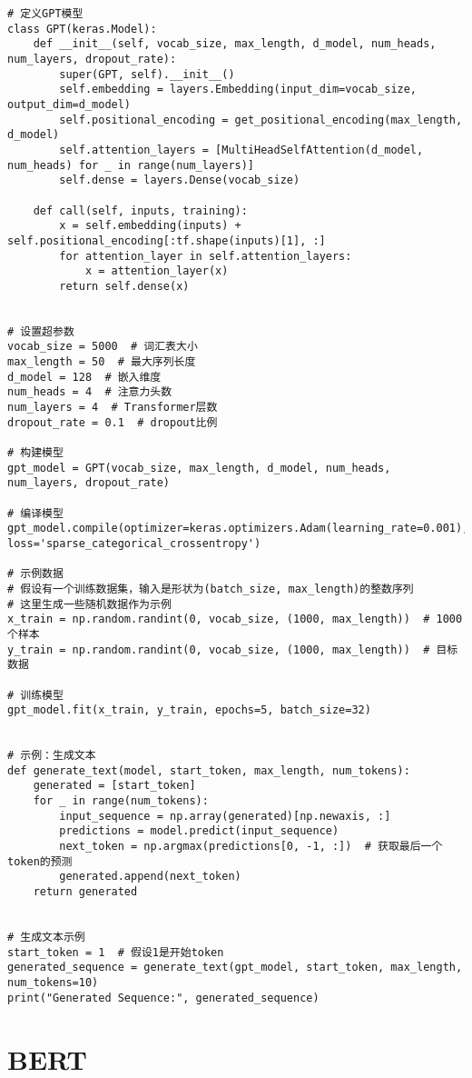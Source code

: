 \begin{lstlisting}
# 定义GPT模型
class GPT(keras.Model):
    def __init__(self, vocab_size, max_length, d_model, num_heads, num_layers, dropout_rate):
        super(GPT, self).__init__()
        self.embedding = layers.Embedding(input_dim=vocab_size, output_dim=d_model)
        self.positional_encoding = get_positional_encoding(max_length, d_model)
        self.attention_layers = [MultiHeadSelfAttention(d_model, num_heads) for _ in range(num_layers)]
        self.dense = layers.Dense(vocab_size)

    def call(self, inputs, training):
        x = self.embedding(inputs) + self.positional_encoding[:tf.shape(inputs)[1], :]
        for attention_layer in self.attention_layers:
            x = attention_layer(x)
        return self.dense(x)


# 设置超参数
vocab_size = 5000  # 词汇表大小
max_length = 50  # 最大序列长度
d_model = 128  # 嵌入维度
num_heads = 4  # 注意力头数
num_layers = 4  # Transformer层数
dropout_rate = 0.1  # dropout比例

# 构建模型
gpt_model = GPT(vocab_size, max_length, d_model, num_heads, num_layers, dropout_rate)

# 编译模型
gpt_model.compile(optimizer=keras.optimizers.Adam(learning_rate=0.001), loss='sparse_categorical_crossentropy')

# 示例数据
# 假设有一个训练数据集，输入是形状为(batch_size, max_length)的整数序列
# 这里生成一些随机数据作为示例
x_train = np.random.randint(0, vocab_size, (1000, max_length))  # 1000个样本
y_train = np.random.randint(0, vocab_size, (1000, max_length))  # 目标数据

# 训练模型
gpt_model.fit(x_train, y_train, epochs=5, batch_size=32)


# 示例：生成文本
def generate_text(model, start_token, max_length, num_tokens):
    generated = [start_token]
    for _ in range(num_tokens):
        input_sequence = np.array(generated)[np.newaxis, :]
        predictions = model.predict(input_sequence)
        next_token = np.argmax(predictions[0, -1, :])  # 获取最后一个token的预测
        generated.append(next_token)
    return generated


# 生成文本示例
start_token = 1  # 假设1是开始token
generated_sequence = generate_text(gpt_model, start_token, max_length, num_tokens=10)
print("Generated Sequence:", generated_sequence)

\end{lstlisting}


\section{BERT}
